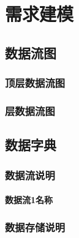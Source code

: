 \chapter{需求建模 }
    \section{数据流图}

        \subsection{顶层数据流图}

        \subsection{层数据流图}

    \section{数据字典}

        \subsection{数据流说明}
            \subsubsection{数据流1名称}

        \subsection{数据存储说明}
